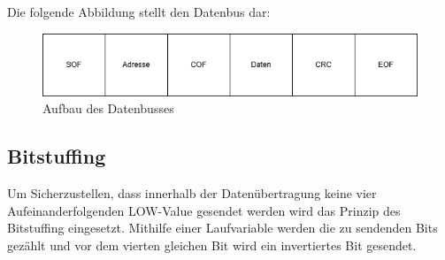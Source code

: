 Die folgende Abbildung stellt den Datenbus dar:
\begin{figure}[H]
    \centering    
    \includegraphics[width=1\textwidth]{Bilder/datenbus.png}
    \caption{Aufbau des Datenbusses}
    \label{Datenbus}
\end{figure}

\subsection{Bitstuffing}
Um Sicherzustellen, dass innerhalb der Datenübertragung keine vier Aufeinanderfolgenden LOW-Value gesendet werden wird das Prinzip des Bitstuffing eingesetzt. Mithilfe einer Laufvariable werden die zu sendenden Bits gezählt und vor dem vierten gleichen Bit wird ein invertiertes Bit gesendet.